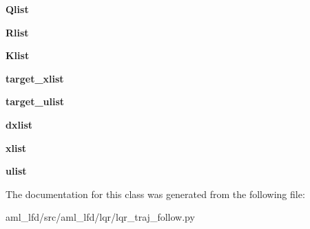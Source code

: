\begin{DoxyCompactItemize}
\item 
\hypertarget{classaml__lfd_1_1lqr_1_1lqr__traj__follow_1_1_l_q_r_traj_follow_a3f5c63feb46c1c5f53a7654930405866}{{\bfseries Qlist}}\label{classaml__lfd_1_1lqr_1_1lqr__traj__follow_1_1_l_q_r_traj_follow_a3f5c63feb46c1c5f53a7654930405866}

\item 
\hypertarget{classaml__lfd_1_1lqr_1_1lqr__traj__follow_1_1_l_q_r_traj_follow_a677cefc87aae3e07521793209eb6a23d}{{\bfseries Rlist}}\label{classaml__lfd_1_1lqr_1_1lqr__traj__follow_1_1_l_q_r_traj_follow_a677cefc87aae3e07521793209eb6a23d}

\item 
\hypertarget{classaml__lfd_1_1lqr_1_1lqr__traj__follow_1_1_l_q_r_traj_follow_a5f2bda5589414211230b627c8e3a898c}{{\bfseries Klist}}\label{classaml__lfd_1_1lqr_1_1lqr__traj__follow_1_1_l_q_r_traj_follow_a5f2bda5589414211230b627c8e3a898c}

\item 
\hypertarget{classaml__lfd_1_1lqr_1_1lqr__traj__follow_1_1_l_q_r_traj_follow_aab5b823ec9dc177f15a50fc07fdf76bd}{{\bfseries target\-\_\-xlist}}\label{classaml__lfd_1_1lqr_1_1lqr__traj__follow_1_1_l_q_r_traj_follow_aab5b823ec9dc177f15a50fc07fdf76bd}

\item 
\hypertarget{classaml__lfd_1_1lqr_1_1lqr__traj__follow_1_1_l_q_r_traj_follow_a6543397245f6804c23f2f3adde765f5f}{{\bfseries target\-\_\-ulist}}\label{classaml__lfd_1_1lqr_1_1lqr__traj__follow_1_1_l_q_r_traj_follow_a6543397245f6804c23f2f3adde765f5f}

\item 
\hypertarget{classaml__lfd_1_1lqr_1_1lqr__traj__follow_1_1_l_q_r_traj_follow_a1c7fc079361b526c5af7447d2c744867}{{\bfseries dxlist}}\label{classaml__lfd_1_1lqr_1_1lqr__traj__follow_1_1_l_q_r_traj_follow_a1c7fc079361b526c5af7447d2c744867}

\item 
\hypertarget{classaml__lfd_1_1lqr_1_1lqr__traj__follow_1_1_l_q_r_traj_follow_a35e6ec1df9ee8d476105209def393a1b}{{\bfseries xlist}}\label{classaml__lfd_1_1lqr_1_1lqr__traj__follow_1_1_l_q_r_traj_follow_a35e6ec1df9ee8d476105209def393a1b}

\item 
\hypertarget{classaml__lfd_1_1lqr_1_1lqr__traj__follow_1_1_l_q_r_traj_follow_a9998974c298bc9a488ce3a01d5269544}{{\bfseries ulist}}\label{classaml__lfd_1_1lqr_1_1lqr__traj__follow_1_1_l_q_r_traj_follow_a9998974c298bc9a488ce3a01d5269544}

\end{DoxyCompactItemize}


The documentation for this class was generated from the following file\-:\begin{DoxyCompactItemize}
\item 
aml\-\_\-lfd/src/aml\-\_\-lfd/lqr/lqr\-\_\-traj\-\_\-follow.\-py\end{DoxyCompactItemize}
